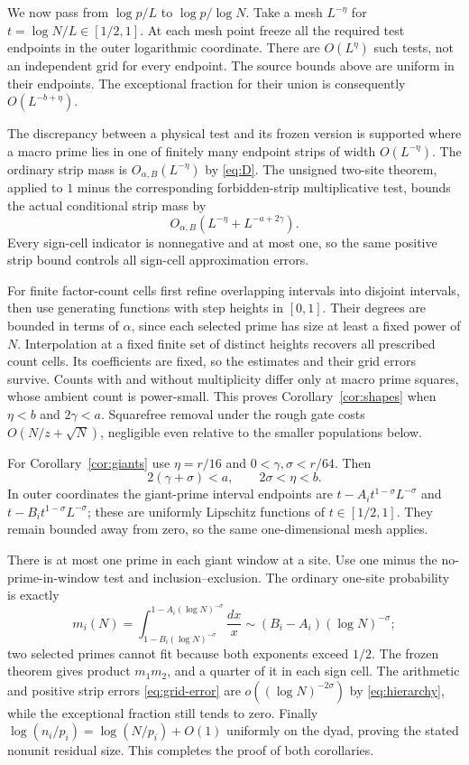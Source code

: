 \documentclass[11pt]{article}
\theoremstyle{remark}\newtheorem{remark}[theorem]{Remark}
\begin{document}
We now pass from $\log p/L$ to $\log p/\log N$.
Take a mesh $L^{-\eta}$ for $t=\log N/L\in[1/2,1]$.
At each mesh point freeze all the required test endpoints in the
outer logarithmic coordinate. There are $O(L^\eta)$ such tests,
not an independent grid for every endpoint. The source bounds above
are uniform in their endpoints. The exceptional fraction for their
union is consequently $O(L^{-b+\eta})$.

The discrepancy between a physical test and its frozen version is
supported where a macro prime lies in one of finitely many endpoint
strips of width $O(L^{-\eta})$. The ordinary strip mass is
$O_{\alpha,B}(L^{-\eta})$ by \eqref{eq:D}.
The unsigned two-site theorem, applied to $1$ minus the corresponding
forbidden-strip multiplicative test, bounds the actual conditional
strip mass by
\begin{equation}\label{eq:grid-error}
 O_{\alpha,B}(L^{-\eta}+L^{-a+2\gamma}).
\end{equation}
Every sign-cell indicator is nonnegative and at most one, so the same
positive strip bound controls all sign-cell approximation errors.

For finite factor-count cells first refine overlapping intervals into
disjoint intervals, then use generating functions with step
heights in $[0,1]$. Their degrees are bounded in terms of $\alpha$,
since each selected prime has size at least a fixed power of $N$.
Interpolation at a fixed finite set of distinct heights recovers all
prescribed count cells. Its coefficients are fixed, so the estimates
and their grid errors survive. Counts with and without multiplicity
differ only at macro prime squares, whose ambient count is power-small.
This proves Corollary~\ref{cor:shapes} when $\eta<b$ and $2\gamma<a$.
Squarefree removal under the rough gate costs
$O(N/z+\sqrt N)$, negligible even relative to the smaller populations
below.

For Corollary~\ref{cor:giants} use $\eta=r/16$ and
$0<\gamma,\sigma<r/64$. Then
\begin{equation}\label{eq:hierarchy}
       2(\gamma+\sigma)<a,\qquad 2\sigma<\eta<b.
\end{equation}
In outer coordinates the giant-prime interval endpoints are
$t-A_i t^{1-\sigma}L^{-\sigma}$ and
$t-B_i t^{1-\sigma}L^{-\sigma}$; these are uniformly Lipschitz
functions of $t\in[1/2,1]$. They remain bounded away from zero,
so the same one-dimensional mesh applies.

There is at most one prime in each giant window at a site. Use
one minus the no-prime-in-window test and inclusion--exclusion.
The ordinary one-site probability is exactly
\[
 m_i(N)=\int_{1-B_i(\log N)^{-\sigma}}^{1-A_i(\log N)^{-\sigma}}
                       \frac{dx}{x}
       \sim(B_i-A_i)(\log N)^{-\sigma};
\]
two selected primes cannot fit because both exponents exceed $1/2$.
The frozen theorem gives product $m_1m_2$, and a quarter of it in
each sign cell. The arithmetic and positive strip errors
\eqref{eq:grid-error} are $o((\log N)^{-2\sigma})$ by
\eqref{eq:hierarchy}, while the exceptional fraction still tends to
zero. Finally
$\log(n_i/p_i)=\log(N/p_i)+O(1)$ uniformly on the dyad, proving the
stated nonunit residual size. This completes the proof of both corollaries.
\end{document}
